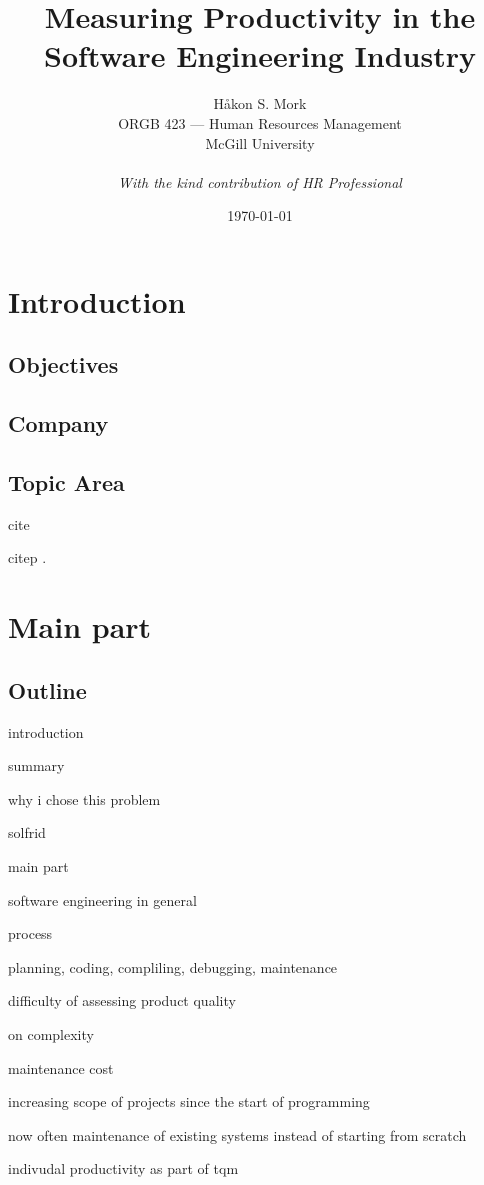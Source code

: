 \documentclass[letterpaper, 12pt]{report}
\title{\Huge \textbf{Measuring Productivity in the Software Engineering Industry}}
\author{
	Håkon S. Mork \\ 
	ORGB 423 --- Human Resources Management \\ 
	McGill University \\
	\\
	\emph{With the kind contribution of HR Professional}
}
\date{\today}
\begin{document}
\maketitle
\tableofcontents

\chapter{Introduction}
\section{Objectives}

\section{Company}

\section{Topic Area}

cite \cite{goossens93} 

citep \citep{goossens93}.

\chapter{Main part}
\section{Outline}

introduction

	summary

	why i chose this problem

	solfrid

main part

	software engineering in general

		process

			planning, coding, compliling, debugging, maintenance

		difficulty of assessing product quality

		on complexity

			maintenance cost

			increasing scope of projects since the start of programming

			now often maintenance of existing systems instead of starting from scratch

		indivudal productivity as part of tqm
\end{document}
